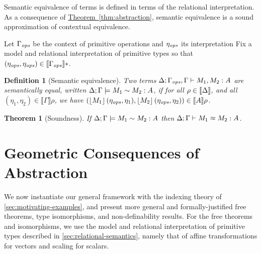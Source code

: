 \documentclass{sigplanconf}
\newcommand{\tmSem}[1]{\left\lfloor{#1}\right\rfloor}
\newcommand{\rsem}[1]{\llbracket #1 \rrbracket}
\newtheorem{theorem}{Theorem}
\newtheorem{definition}{Definition}
\newcommand{\thmref}[1]{\hyperref[#1]{Theorem~\ref*{#1}}}
\newcommand{\defref}[1]{\hyperref[#1]{Definition~\ref*{#1}}}
\theoremstyle{examplestyle}
\newtheorem{example}{Example}
\theoremstyle{restatementstyle}
\begin{document}
Semantic equivalence of terms is defined in terms of the relational
interpretation. As a consequence of \thmref{thm:abstraction}, semantic
equivalence is a sound approximation of contextual equivalence.

  Let $\Gamma_{\mathit{ops}}$ be the context of primitive operations and $\eta_{\mathit{ops}}$  its interpretation 
Fix a model and relational interpretation of primitive types so that
  $(\opsEnv, \opsEnv) \in  \rsem{\opsCtxt} *$.

\begin{definition}[Semantic equivalence]\label{def:semantic-equality}
  Two terms $\Delta; \Gamma_{\mathit{ops}}, \Gamma \vdash M_1 , M_2 : A$
  are
  \emph{semantically equal},
  written ${\Delta};{\Gamma}\models{M_1}\sim{M_2}:{A}$, if for all $\rho \in
  \llbracket \Delta \rrbracket$, and all $(\eta_1,\eta_2) \in
  \rsem{\Gamma} \rho$, we have
  $(\tmSem{M_1}(\opsEnv,
  \eta_1),\tmSem{M_2}(\opsEnv, \eta_2)) \in
  \rsem{A}\rho$.
\end{definition}

\begin{theorem}[Soundness]\label{thm:soundness}
If ${\Delta};{\Gamma}\models{M_1}\sim{M_2}:{A}$ then
${\Delta};{\Gamma}\vdash{M_1}\approx{M_2}:{A}$.
\end{theorem}


\section{Geometric Consequences of Abstraction}
\label{sec:instantiations}
We now instantiate our general framework %
with
the indexing theory of \autoref{sec:motivating-examples}, and present
more general and formally-justified free theorems, type isomorphisms,
and non-definability results.  For the free theorems and isomorphisms,
we use the model and relational interpretation of primitive types
described in \autoref{sec:relational-semantics}, namely that of
affine transformations for vectors and scaling for scalars.

\end{document}
